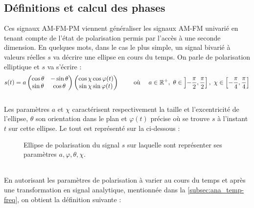 \subsection{Définitions et calcul des phases} \label{subsec:AM-FM-PM}

Ces signaux AM-FM-PM viennent généraliser les signaux AM-FM univarié en tenant compte de l'état de polarisation permis par l'accès à une seconde dimension. 
En quelques mots, dans le cas le plus simple, un signal bivarié à valeurs réelles $s$ va décrire une ellipse en cours du temps. 
On parle de polarisation elliptique et $s$ va s'écrire :
\[s(t) = a \begin{pmatrix} \cos\theta & -\sin\theta \\ \sin\theta  &  \cos\theta \end{pmatrix} \begin{pmatrix} \cos\chi \cos\varphi(t) \\ \sin\chi \sin\varphi(t) \end{pmatrix}  \qquad \text{ où }\quad  a\in\mathbb{R}^+,\ \theta \in \left]-\frac{\pi}{2}, \frac{\pi}{2}\right],\ \chi \in \left[-\frac{\pi}{4}, \frac{\pi}{4}\right] \]
\\
Les paramètres $a$ et $\chi$ caractérisent respectivement la taille et l'excentricité de l'ellipse, $\theta$ son orientation dans le plan et $\varphi(t)$ précise où se trouve $s$ à l'instant $t$ sur cette ellipse. 
Le tout est représenté sur la  ci-dessous :
\begin{figure}[H]
	
	\caption[Ellipse de polarisation d'un signal bivarié réel]{Ellipse de polarisation du signal $s$ sur laquelle sont représenter ses paramètres $a,\varphi,\theta,\chi$.}
	\label{fig:ellipse2polar}
\end{figure}
\skipl \\
En autorisant les paramètres de polarisation à varier au cours du temps et après une transformation en signal analytique, mentionnée dans la \cref{subsec:ana_temp-freq}, on obtient la définition suivante :
\\
